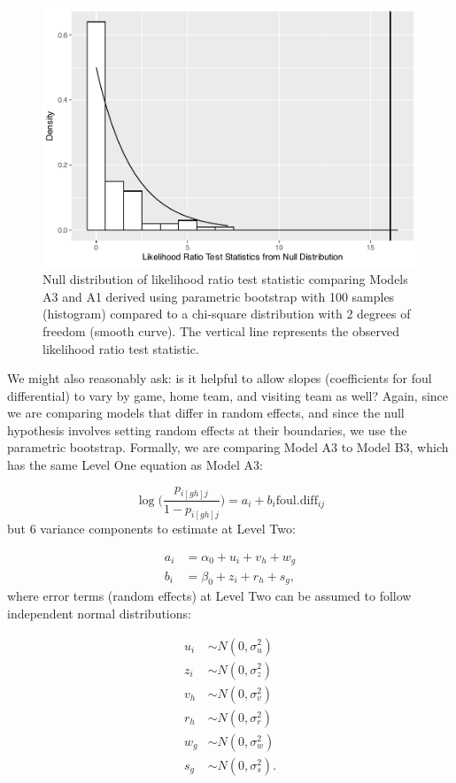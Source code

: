 \documentclass[
]{krantz}
\begin{document}
\begin{figure}

{\centering \includegraphics[width=0.6\linewidth]{bookdown-BeyondMLR_files/figure-latex/gmu-lrt1-1} 

}

\caption{Null distribution of likelihood ratio test statistic comparing Models A3 and A1 derived using parametric bootstrap with 100 samples (histogram) compared to a chi-square distribution with 2 degrees of freedom (smooth curve).  The vertical line represents the observed likelihood ratio test statistic.}\label{fig:gmu-lrt1}
\end{figure}

We might also reasonably ask: is it helpful to allow slopes (coefficients for foul differential) to vary by game, home team, and visiting team as well? Again, since we are comparing models that differ in random effects, and since the null hypothesis involves setting random effects at their boundaries, we use the parametric bootstrap. Formally, we are comparing Model A3 to Model B3, which has the same Level One equation as Model A3:

\[ \log\bigg(\frac{p_{i[gh]j}}{1-p_{i[gh]j}}\bigg)=a_{i}+b_{i}\mathrm{foul.diff}_{ij} \]
but 6 variance components to estimate at Level Two:

\begin{align*}
a_{i} & = \alpha_{0}+u_{i}+v_{h}+w_{g} \\
b_{i} & = \beta_{0}+z_{i}+r_{h}+s_{g},
\end{align*}
where error terms (random effects) at Level Two can be assumed to follow independent normal distributions:

\begin{align*}
u_{i} & \sim N \left( 0 , \sigma_{u}^{2} \right) \\
z_{i} & \sim N \left( 0 , \sigma_{z}^{2} \right) \\
v_{h} & \sim N \left( 0 , \sigma_{v}^{2} \right) \\
r_{h} & \sim N \left( 0 , \sigma_{r}^{2} \right) \\
w_{g} & \sim N \left( 0 , \sigma_{w}^{2} \right) \\
s_{g} & \sim N \left( 0 , \sigma_{s}^{2} \right).
\end{align*}
\end{document}
